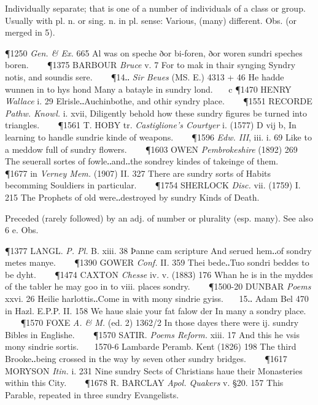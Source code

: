\begin{description}[wide, labelwidth=!, labelindent=0pt]
\begin{myenumerate}
 Individually separate; that is one of a number of individuals of a class or group. Usually with pl. n. or sing. n. in pl. sense: Various, (many) different. Obs. (or merged in 5).

\P 1250 \textit{Gen. \& Ex.}  665 Al was on speche ðor bi-foren, ðor woren sundri speches boren.    
\P 1375 BARBOUR  \textit{Bruce} v. 7 For to mak in thair synging Syndry notis, and soundis sere.    
\P 14‥ \textit{Sir Beues} (MS. E.) 4313 + 46 He hadde wunnen in to hys hond Many a batayle in sundry lond.    c 
\P 1470 HENRY  \textit{Wallace} i. 29 Elrisle‥Auchinbothe, and othir syndry place.    
\P 1551 RECORDE  \textit{Pathw. Knowl.} i. xvii, Diligently behold how these sundry figures be turned into triangles.    
\P 1561 T. HOBY tr. \textit{Castiglione's Courtyer} i. (1577) D vij b, In learning to handle sundrie kinde of weapons.    
\P 1596 \textit{Edw.  III}, iii. i. 69 Like to a meddow full of sundry flowers.    
\P 1603 OWEN  \textit{Pembrokeshire} (1892) 269 The seuerall sortes of fowle‥and‥the sondrey kindes of takeinge of them.    
\P 1677 in  \textit{Verney Mem.} (1907) II. 327 There are sundry sorts of Habits becomming Souldiers in particular.    
\P 1754 SHERLOCK  \textit{Disc.} vii. (1759) I. 215 The Prophets of old were‥destroyed by sundry Kinds of Death.

 Preceded (rarely followed) by an adj. of number or plurality (esp. many). See also 6 e. Obs.

\P 1377 LANGL.  \textit{P. Pl.} B. xiii. 38 Þanne cam scripture And serued hem‥of sondry metes manye.    
\P 1390 GOWER  \textit{Conf.} II. 359 Thei bede‥Tuo sondri beddes to be dyht.    
\P 1474 CAXTON  \textit{Chesse} iv. v. (1883) 176 Whan he is in the myddes of the tabler he may goo in to viii. places sondry.    
\P 1500-20 DUNBAR  \textit{Poems} xxvi. 26 Heilie harlottis‥Come in with mony sindrie gyiss.    15‥ Adam Bel 470 in Hazl. E.P.P. II. 158 We haue slaie your fat falow der In many a sondry place.    
\P 1570 FOXE  \textit{A. \& M.} (ed. 2) 1362/2 In those dayes there were ij. sundry Bibles in Englishe.    
\P 1570 SATIR.  \textit{Poems Reform.} xiii. 17 And this he vsis mony sindrie sortis.    1570-6 Lambarde Peramb. Kent (1826) 198 The third Brooke‥being crossed in the way by seven other sundry bridges.    
\P 1617 MORYSON  \textit{Itin.} i. 231 Nine sundry Sects of Christians haue their Monasteries within this City.    
\P 1678 R. BARCLAY  \textit{Apol. Quakers} v. §20. 157 This Parable, repeated in three sundry Evangelists.


\end{myenumerate}
\end{description}
